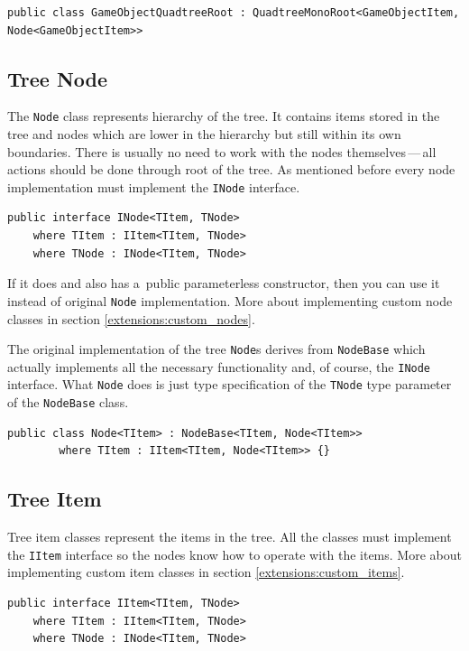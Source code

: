 \documentclass{article}
\begin{document}
\begin{verbatim}
public class GameObjectQuadtreeRoot : QuadtreeMonoRoot<GameObjectItem, Node<GameObjectItem>>
\end{verbatim}

\subsection{Tree Node} \label{details:node}
The \texttt{Node} class represents hierarchy of the tree.
It contains items stored in the tree and nodes which are lower in the hierarchy but still within its own boundaries.
There is usually no need to work with the nodes themselves\,---\,all actions should be done through root of the tree.
As mentioned before every node implementation must implement the \texttt{INode} interface.

\begin{verbatim}
public interface INode<TItem, TNode>
    where TItem : IItem<TItem, TNode>
    where TNode : INode<TItem, TNode>
\end{verbatim}

If it does and also has a~public parameterless constructor, then you can use it instead of original \texttt{Node} implementation.
More about implementing custom node classes in section \ref{extensions:custom_nodes}.

The original implementation of the tree \texttt{Node}s derives from \texttt{NodeBase} which actually implements all the necessary functionality and, of course, the \texttt{INode} interface.
What \texttt{Node} does is just type specification of the \texttt{TNode} type parameter of the \texttt{NodeBase} class.

\begin{verbatim}
public class Node<TItem> : NodeBase<TItem, Node<TItem>>
        where TItem : IItem<TItem, Node<TItem>> {}
\end{verbatim}

\subsection{Tree Item} \label{details:item}
Tree item classes represent the items in the tree.
All the classes must implement the \texttt{IItem} interface so the nodes know how to operate with the items.
More about implementing custom item classes in section \ref{extensions:custom_items}.

\begin{verbatim}
public interface IItem<TItem, TNode>
    where TItem : IItem<TItem, TNode>
    where TNode : INode<TItem, TNode>
\end{verbatim}
\end{document}
